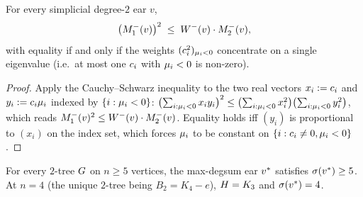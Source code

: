 \begin{lemma}\label{lem:CS}
For every simplicial degree-$2$ ear $v$,
\[
\bigl(M_{1}^{-}(v)\bigr)^{2} \;\le\; W^{-}(v) \cdot M_{2}^{-}(v),
\]
with equality if and only if the weights $(c_{i}^{2})_{\mu_{i} < 0}$
concentrate on a single eigenvalue (i.e.\ at most one
$c_{i}$ with $\mu_{i} < 0$ is non-zero).
\end{lemma}

\begin{proof}
Apply the Cauchy--Schwarz inequality to the two real vectors
$x_{i} := c_{i}$ and $y_{i} := c_{i} \mu_{i}$ indexed by
$\{i : \mu_{i} < 0\}$:
$\bigl(\sum_{i: \mu_{i} < 0} x_{i} y_{i}\bigr)^{2}
\le \bigl(\sum_{i: \mu_{i} < 0} x_{i}^{2}\bigr)
\bigl(\sum_{i: \mu_{i} < 0} y_{i}^{2}\bigr)$, which reads
$M_{1}^{-}(v)^{2} \le W^{-}(v) \cdot M_{2}^{-}(v)$. Equality holds iff
$(y_{i})$ is proportional to $(x_{i})$ on the index set, which forces
$\mu_{i}$ to be constant on $\{i : c_{i} \ne 0, \mu_{i} < 0\}$.
\end{proof}

\begin{lemma}\label{lem:sigma-floor}
For every $2$-tree $G$ on $n \ge 5$ vertices, the max-degsum ear
$v^{*}$ satisfies $\sigma(v^{*}) \ge 5$. At $n = 4$ (the unique
$2$-tree being $B_{2} = K_{4} - e$), $H = K_{3}$ and
$\sigma(v^{*}) = 4$.
\end{lemma}

